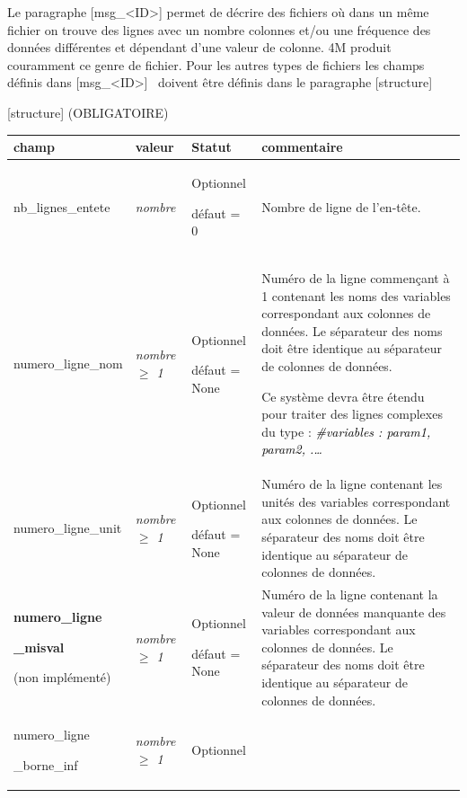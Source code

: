 \medskip
Le paragraphe [msg\_{\textless}ID{\textgreater}] permet de décrire des fichiers où dans un même fichier on trouve des
lignes avec un nombre colonnes et/ou une fréquence des données différentes et dépendant d'une valeur de colonne. 4M
produit couramment ce genre de fichier. Pour les autres types de fichiers les champs définis dans
[msg\_{\textless}ID{\textgreater}] \ doivent être définis dans le paragraphe [structure]

\medskip
{\large \color{blue} [structure] (OBLIGATOIRE)}

\begin{center}
\tablefirsthead{}
\tabletail{\hline}
\tablelasttail{}
\begin{supertabular}{|p{3.592cm}|p{2.116cm}|p{4.099cm}|p{5.393cm}|}
\hline
champ &
valeur &
Statut &
commentaire\\\hline
nb\_lignes\_entete &
{\itshape nombre} &
Optionnel

défaut = 0 &
Nombre de ligne de l'en{}-tête. \\\hline
numero\_ligne\_nom &
{\itshape nombre ${\geq}$ 1} &
Optionnel

défaut = None &
Numéro de la ligne commençant à 1 contenant les noms des variables correspondant aux colonnes de données. Le séparateur
des noms doit être identique au séparateur de colonnes de données.

Ce système devra être étendu pour traiter des lignes complexes du type : \textit{\textcolor{black}{\#variables : param1,
param2, .{\dots}}}\\\hline
numero\_ligne\_unit &
{\itshape nombre ${\geq}$ 1} &
Optionnel

défaut = None &
Numéro de la ligne contenant les unités des variables correspondant aux colonnes de données. Le séparateur des noms doit
être identique au séparateur de colonnes de données.\\\hline
\textbf{numero\_ligne}

\textbf{\_misval}  

(non implémenté) &
{\itshape nombre ${\geq}$ 1} &
Optionnel

défaut = None &
Numéro de la ligne contenant la valeur de données manquante des variables correspondant aux colonnes de données. Le
séparateur des noms doit être identique au séparateur de colonnes de données.\\\hline
numero\_ligne

\_borne\_inf  &
{\itshape nombre ${\geq}$ 1} &
Optionnel


\end{supertabular}
\end{center}
